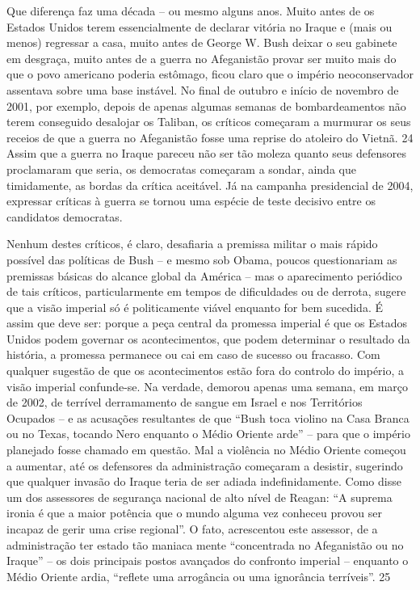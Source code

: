 \par
 
Que diferença faz uma década – ou mesmo alguns anos. Muito antes de os Estados Unidos terem essencialmente de declarar vitória no Iraque e (mais ou menos) regressar a casa, muito antes de George W. Bush deixar o seu gabinete em desgraça, muito antes de a guerra no Afeganistão provar ser muito mais do que o povo americano poderia estômago, ficou claro que o império neoconservador assentava sobre uma base instável. No final de outubro e início de novembro de 2001, por exemplo, depois de apenas algumas semanas de bombardeamentos não terem conseguido desalojar os Taliban, os críticos começaram a murmurar os seus receios de que a guerra no Afeganistão fosse uma reprise do atoleiro do Vietnã.
 {\color{blue} 24}  
Assim que a guerra no Iraque pareceu não ser tão moleza quanto seus defensores proclamaram que seria, os democratas começaram a sondar, ainda que timidamente, as bordas da crítica aceitável. Já na campanha presidencial de 2004, expressar críticas à guerra se tornou uma espécie de teste decisivo entre os candidatos democratas.
 
\par
 
Nenhum destes críticos, é claro, desafiaria a premissa militar o mais rápido possível das políticas de Bush – e mesmo sob Obama, poucos questionariam as premissas básicas do alcance global da América – mas o aparecimento periódico de tais críticos, particularmente em tempos de dificuldades ou de derrota, sugere que a visão imperial só é politicamente viável enquanto for bem sucedida. É assim que deve ser: porque a peça central da promessa imperial é que os Estados Unidos podem governar os acontecimentos, que podem determinar o resultado da história, a promessa permanece ou cai em caso de sucesso ou fracasso. Com qualquer sugestão de que os acontecimentos estão fora do controlo do império, a visão imperial confunde-se. Na verdade, demorou apenas uma semana, em março de 2002, de terrível derramamento de sangue em Israel e nos Territórios Ocupados – e as acusações resultantes de que “Bush toca violino na Casa Branca ou no Texas, tocando Nero enquanto o Médio Oriente arde” – para que o império planejado fosse chamado em questão. Mal a violência no Médio Oriente começou a aumentar, até os defensores da administração começaram a desistir, sugerindo que qualquer invasão do Iraque teria de ser adiada indefinidamente. Como disse um dos assessores de segurança nacional de alto nível de Reagan: “A suprema ironia é que a maior potência que o mundo alguma vez conheceu provou ser incapaz de gerir uma crise regional”. O fato, acrescentou este assessor, de a administração ter estado tão maniaca mente “concentrada no Afeganistão ou no Iraque” – os dois principais postos avançados do confronto imperial – enquanto o Médio Oriente ardia, “reflete uma arrogância ou uma ignorância terríveis”.
 {\color{blue} 25}  

